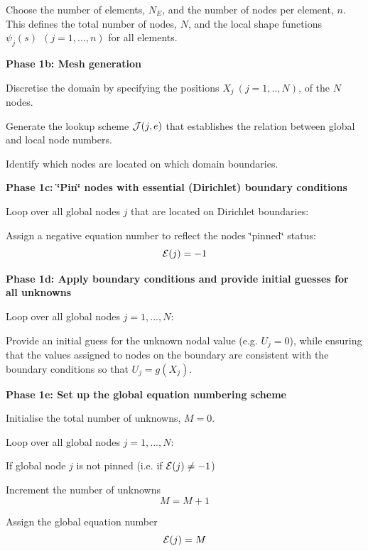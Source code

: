 \begin{DoxyItemize}
\item Choose the number of elements, $ N_E $, and the number of nodes per element, $ n$. This defines the total number of nodes, $N$, and the local shape functions $ \psi_j(s) \ \ (j=1,...,n)$ for all elements.

{\bfseries  Phase 1b\+: Mesh generation}
\item Discretise the domain by specifying the positions $ X_j \ (j=1,..,N)$, of the $ N $ nodes.
\item Generate the lookup scheme $ {\cal J}(j,e)$ that establishes the relation between global and local node numbers.
\item Identify which nodes are located on which domain boundaries.

{\bfseries  Phase 1c\+: \char`\"{}\+Pin\char`\"{} nodes with essential (Dirichlet) boundary conditions }
\item Loop over all global nodes $ j $ that are located on Dirichlet boundaries\+:
\begin{DoxyItemize}
\item Assign a negative equation number to reflect the node\textquotesingle{}s \char`\"{}pinned\char`\"{} status\+: \[ {\cal E}(j) = -1 \]
\end{DoxyItemize}

{\bfseries  Phase 1d\+: Apply boundary conditions and provide initial guesses for all unknowns}
\item Loop over all global nodes $j=1,...,N$\+:
\begin{DoxyItemize}
\item Provide an initial guess for the unknown nodal value (e.\+g. $ U_j=0 $), while ensuring that the values assigned to nodes on the boundary are consistent with the boundary conditions so that $ U_j = g(X_j). $
\end{DoxyItemize}

{\bfseries  Phase 1e\+: Set up the global equation numbering scheme}
\item Initialise the total number of unknowns, $M=0.$
\item Loop over all global nodes $j=1,...,N$\+:
\begin{DoxyItemize}
\item If global node $ j $ is not pinned (i.\+e. if $ {\cal E}(j) \ne -1 $)
\begin{DoxyItemize}
\item Increment the number of unknowns \[ M=M+1 \]
\item Assign the global equation number \[ {\cal E}(j) = M \]
\end{DoxyItemize}
\end{DoxyItemize}


\end{DoxyItemize}

